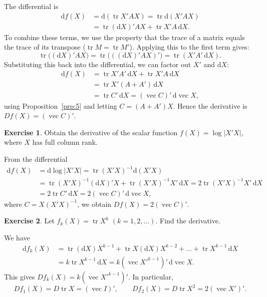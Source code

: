 \documentclass[12pt,a4paper]{article}
\makeatletter
\theoremstyle{definition}
\newtheorem{exercise}{Exercise}
\renewenvironment{proof}[1][\proofname]{\par
  \pushQED{\qed}%
  \normalfont \topsep6\p@\@plus6\p@\relax
  \trivlist
  \item[\hskip\labelsep\bfseries #1\@addpunct{.}]\ignorespaces
}{%
  \popQED\endtrivlist\@endpefalse
}
\newenvironment{solution}{%
  \begin{proof}[Solution]%
}{%
  \end{proof}%
}
\DeclareMathOperator{\tr}{tr}
\DeclareMathOperator{\avec}{vec}
\newcommand{\dd}{\mathrm{d}}
\makeatother
\begin{document}
\begin{solution}
The differential is
\begin{align*}
\dd f(X) &= \dd(\tr X'AX) = \tr \dd(X'AX) \\
&= \tr(\dd X)'AX + \tr X'A\, \dd X.
\end{align*}
To combine these terms, we use the property that the trace of a matrix equals the trace of its transpose ($\tr M = \tr M'$). Applying this to the first term gives:
\[
\tr\bigl((\dd X)'AX\bigr) = \tr\bigl(((\dd X)'AX)'\bigr) = \tr(X'A'\, \dd X).
\]
Substituting this back into the differential, we can factor out $X'$ and $\dd X$:
\begin{align*}
\dd f(X) &= \tr X'A'\, \dd X + \tr X'A\, \dd X \\
&= \tr X'(A + A')\, \dd X \\
&= \tr C'\, \dd X = (\avec C)'\, \dd\avec X,
\end{align*}
using Proposition~\ref{prp:5} and letting $C = (A + A')X$. %
Hence the derivative is $Df(X) = (\avec C)'$.
\end{solution}

\begin{exercise}\label{exer:20}
Obtain the derivative of the scalar function $f(X) = \log|X'X|$, where $X$ has full column rank.
\end{exercise}

\begin{solution}
From the differential
\begin{align*}
\dd f(X) &= \dd\log|X'X| = \tr(X'X)^{-1} \dd(X'X) \\
&= \tr(X'X)^{-1}(\dd X)'X + \tr(X'X)^{-1}X'\, \dd X = 2\tr(X'X)^{-1}X'\, \dd X \\
&= 2\tr C'\, \dd X = 2(\avec C)'\, \dd\avec X,
\end{align*}
where $C = X(X'X)^{-1}$, we obtain $Df(X) = 2(\avec C)'$. %
\end{solution}

\begin{exercise}\label{exer:21}
Let $f_k(X) = \tr X^k$ $(k = 1, 2, \dots)$. Find the derivative.
\end{exercise}

\begin{solution}
We have
\begin{align*}
\dd f_k(X) &= \tr(\dd X)X^{k-1} + \tr X(\dd X)X^{k-2} + \dots + \tr X^{k-1}\, \dd X \\
&= k\tr X^{k-1}\, \dd X = k(\avec X'^{k-1})'\, \dd\avec X.
\end{align*}
This gives $Df_k(X) = k(\avec X'^{k-1})'$. In particular,
\[
Df_1(X) = D\tr X = (\avec I)', \qquad Df_2(X) = D\tr X^2 = 2(\avec X')'.
\]
\end{solution}
\end{document}
